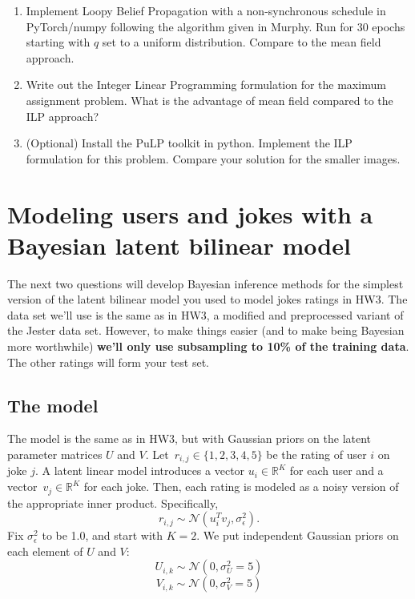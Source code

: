 \documentclass{harvardml}
\newcommand{\R}{\mathbb{R}}
\theoremstyle{plain}
\begin{document}
\begin{problem}
\begin{enumerate}
\item Implement Loopy Belief Propagation with a non-synchronous
  schedule in PyTorch/numpy following the algorithm given in
  Murphy. Run for 30 epochs starting with $q$ set to a uniform
  distribution. Compare to the mean field approach.

\item Write out the Integer Linear Programming formulation for the
  maximum assignment problem.  What is the advantage of mean field
  compared to the ILP approach?

\item (Optional) Install the PuLP toolkit in python. Implement the ILP
  formulation for this problem. Compare your solution for the smaller
  images.

\end{enumerate}
\end{problem}

\newpage

\section*{Modeling users and jokes with a Bayesian latent bilinear model}

The next two questions will develop Bayesian inference methods for the simplest version of the latent bilinear model you used to model jokes ratings in HW3. The data set we'll use is the same as in HW3, a modified and preprocessed variant of the Jester data set. However, to make things easier (and to make being Bayesian more worthwhile) {\bf we'll only use subsampling to 10\% of the training data}.  The other ratings will form your test set.

\subsection*{The model}

The model is the same as in HW3, but with Gaussian priors on the latent parameter matrices $U$ and $V$. Let~${r_{i,j}\in\{1,2,3,4,5\}}$ be the rating of user $i$ on joke $j$.  A latent linear model introduces a vector ${u_i\in\R^K}$ for each user and a vector~${v_j\in\R^K}$ for each joke.  Then, each rating is modeled as a noisy version of the appropriate inner product. Specifically,
\[
r_{i,j} \sim \mathcal{N}(u_i^T v_j, \sigma_\epsilon^2).
\]
Fix $\sigma_\epsilon^2$ to be 1.0, and start with $K = 2$. We put independent Gaussian priors on each element of $U$ and $V$:
\[U_{i,k} \sim \mathcal{N}(0, \sigma_U^2=5)\]
\[V_{i,k} \sim \mathcal{N}(0, \sigma_V^2=5)\]
\end{document}
